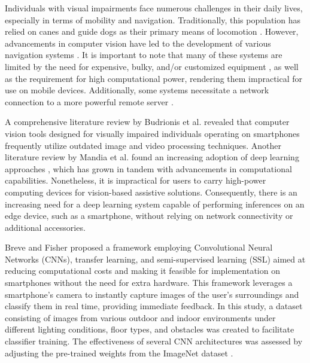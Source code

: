 \documentclass[final,5p,times,twocolumn]{elsarticle}
\begin{document}
Individuals with visual impairments face numerous challenges in their daily lives, especially in terms of mobility and navigation. Traditionally, this population has relied on canes and guide dogs as their primary means of locomotion \cite{islam2019}. However, advancements in computer vision have led to the development of various navigation systems \cite{islam2019,mandia2023,budrionis2022,kuriakose2021,cardillo2019,bai2019,jiang2019,joe2019,hoang2017,tapu2017,saffoury2016,poggi2016,lakde2015}. It is important to note that many of these systems are limited by the need for expensive, bulky, and/or customized equipment \cite{hoang2017,tapu2017,saffoury2016,poggi2016,poggi2015,rizzo2017}, as well as the requirement for high computational power, rendering them impractical for use on mobile devices. Additionally, some systems necessitate a network connection to a more powerful remote server \cite{jiang2019,lin2017}.

A comprehensive literature review by Budrionis et al. \cite{budrionis2022} revealed that computer vision tools designed for visually impaired individuals operating on smartphones frequently utilize outdated image and video processing techniques. Another literature review by Mandia et al. \cite{mandia2023} found an increasing adoption of deep learning approaches \cite{lecun2015,goodfellow2016,schmidhuber2015}, which has grown in tandem with advancements in computational capabilities. Nonetheless, it is impractical for users to carry high-power computing devices for vision-based assistive solutions. Consequently, there is an increasing need for a deep learning system capable of performing inferences on an edge device, such as a smartphone, without relying on network connectivity or additional accessories.

Breve and Fisher \cite{breve2020} proposed a framework employing Convolutional Neural Networks (CNNs), transfer learning, and semi-supervised learning (SSL) aimed at reducing computational costs and making it feasible for implementation on smartphones without the need for extra hardware. This framework leverages a smartphone's camera to instantly capture images of the user's surroundings and classify them in real time, providing immediate feedback. In this study, a dataset consisting of images from various outdoor and indoor environments under different lighting conditions, floor types, and obstacles was created to facilitate classifier training. The effectiveness of several CNN architectures was assessed by adjusting the pre-trained weights from the ImageNet dataset \cite{russakovsky2015}.
\end{document}
